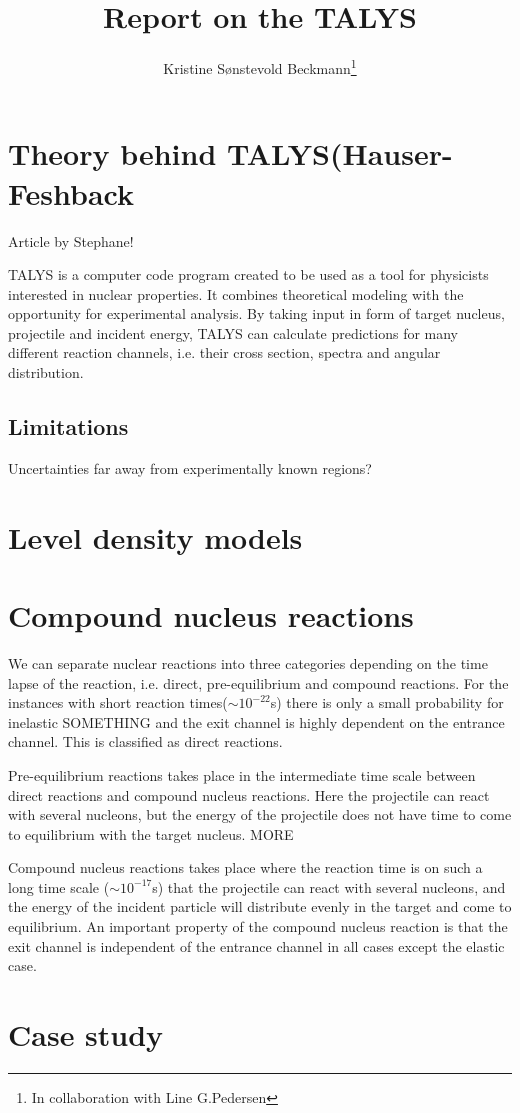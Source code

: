 \documentclass[a4paper,english]{article}
\title{Report on the TALYS}
\author{Kristine Sønstevold Beckmann\footnote{In collaboration with Line G.Pedersen}}
\begin{document}
\maketitle
\section{Theory behind TALYS(Hauser-Feshback}
Article by Stephane!

TALYS is a computer code program created to be used as a tool for physicists interested in nuclear properties. It combines theoretical modeling with the opportunity for experimental analysis.\cite{manual} By taking input in form of target nucleus, projectile and incident energy, TALYS can calculate predictions for many different reaction channels, i.e. their cross section, spectra and angular distribution. 

\subsection{Limitations}
Uncertainties far away from experimentally known regions?
\section{Level density models}
\section{Compound nucleus reactions}
We can separate nuclear reactions into three categories depending on the time lapse of the reaction, i.e. direct, pre-equilibrium and compound reactions.  For the instances with short reaction times($\sim{10^{-22}}$s) there is only a small probability for inelastic SOMETHING and the exit channel is highly dependent on the entrance channel. This is classified as direct reactions.

Pre-equilibrium reactions takes place in the intermediate time scale between direct reactions and compound nucleus reactions. Here the projectile can react with several nucleons, but the energy of the projectile does not have time to come to equilibrium with the target nucleus. MORE

Compound nucleus reactions takes place where the reaction time is on such a long time scale ($\sim{10^{-17}}$s) that the projectile can react with several nucleons, and the energy of the incident particle will distribute evenly in the target and come to equilibrium. An important property of the compound nucleus reaction is that the exit channel is independent of the entrance channel in all cases except the elastic case.

\section{Case study}

\end{document}
